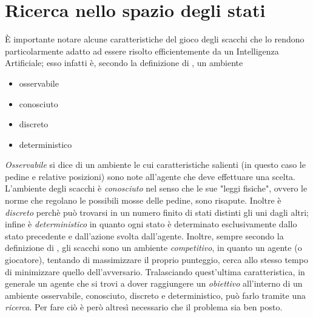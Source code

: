 \section{Ricerca nello spazio degli stati}


È importante notare alcune caratteristiche del gioco degli scacchi che lo rendono particolarmente adatto ad essere risolto efficientemente da un Intelligenza Artificiale; esso infatti è, secondo la definizione di \cite{randw}, un ambiente
\begin{itemize}
   \item osservabile
   \item conosciuto
   \item discreto
   \item deterministico
\end{itemize}

\emph{Osservabile} si dice di un ambiente le cui caratteristiche salienti (in questo caso le pedine e relative posizioni) sono note all'agente che deve effettuare una scelta.
L'ambiente degli scacchi è \emph{conosciuto} nel senso che le sue "leggi fisiche", ovvero le norme che regolano le possibili mosse delle pedine, sono risapute.
Inoltre è \emph{discreto} perchè può trovarsi in un numero finito di stati distinti gli uni dagli altri; infine è \emph{deterministico} in quanto ogni stato è determinato esclusivamente dallo stato precedente e dall'azione svolta dall'agente.
Inoltre, sempre secondo la definizione di \cite{randw}, gli scacchi sono un ambiente \emph{competitivo}, in quanto un agente (o giocatore), tentando di massimizzare il proprio punteggio, cerca allo stesso tempo di minimizzare quello dell'avversario.
Tralasciando quest'ultima caratteristica, in generale un agente che si trovi a dover raggiungere un \emph{obiettivo} all'interno di un ambiente osservabile, conosciuto, discreto e deterministico, può farlo tramite una \emph{ricerca}.
Per fare ciò è però altresì necessario che il problema sia ben posto.

